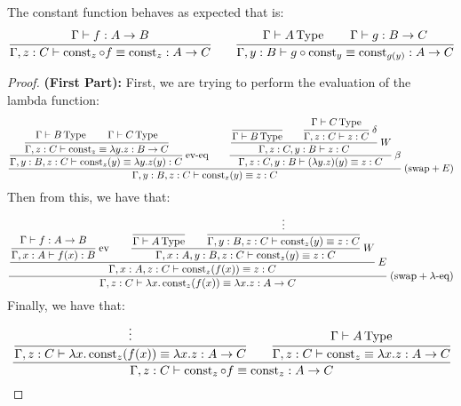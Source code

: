 \begin{lemma}
    \label{lemma:const-funct-compose}
    The constant function behaves as expected that is:
    \begin{equation*}
        \cfrac{\Gamma\vdash f:A\to B}{\Gamma, z:C\vdash \operatorname{const}_z\circ f\equiv\operatorname{const}_z:A\to C} \qquad \cfrac{\Gamma\vdash A\operatorname{Type} \qquad \Gamma\vdash g:B\to C}{\Gamma, y:B\vdash g\circ \operatorname{const}_y\equiv\operatorname{const}_{g(y)}:A\to C}
    \end{equation*}
\end{lemma}
\begin{dem}
\begin{proof}{\textbf{(First Part):}}
    First, we are trying to perform the evaluation of the lambda function:
    \begin{equation*}
        \cfrac{
            \cfrac{\cfrac{\Gamma\vdash B\type \qquad \Gamma\vdash C\type}{\Gamma, z:C\vdash\operatorname{const}_z\equiv\lambda y.z:B\to C}}{\Gamma, y:B, z:C\vdash\operatorname{const}_z(y)\equiv\lambda y.z(y):C}\text{ ev-eq}
            \qquad \cfrac{\cfrac{\cfrac{}{\Gamma\vdash B\type}\qquad \cfrac{\Gamma\vdash C\type}{\Gamma,z:C\vdash z:C} \ \delta}{\Gamma, z:C, y:B\vdash z:C} \ W}{\Gamma, z:C, y:B\vdash(\lambda y.z)(y)\equiv z:C}\ \beta
        }{\Gamma, y:B, z:C\vdash\operatorname{const}_z(y)\equiv z:C} \ (\text{swap}+E)
    \end{equation*}
    Then from this, we have that:
    \begin{equation*}
        \cfrac{\cfrac{\cfrac{\Gamma\vdash f:A\to B}{\Gamma, x:A\vdash f(x):B}\ \text{ev}\qquad \cfrac{\cfrac{}{\Gamma\vdash A\type}\qquad \cfrac{\vdots}{\Gamma, y:B, z:C\vdash\operatorname{const}_z(y)\equiv z:C}}{\Gamma, x:A, y:B, z:C\vdash\operatorname{const}_z(y)\equiv z:C} \ W}{\Gamma, x:A,z:C\vdash\operatorname{const}_z(f(x))\equiv z:C} \ E}{\Gamma,z:C\vdash\lambda x.\operatorname{const}_z(f(x))\equiv\lambda x.z:A\to C}\ (\text{swap}+\lambda\text{-eq})
    \end{equation*}
    Finally, we have that:
    \begin{equation*}
        \cfrac{\cfrac{\vdots}{\Gamma,z:C\vdash\lambda x.\operatorname{const}_z(f(x))\equiv\lambda x.z:A\to C}\qquad\cfrac{\Gamma\vdash A\operatorname{Type}}{\Gamma, z:C\vdash\operatorname{const}_z\equiv\lambda x.z:A\to C}}{\Gamma, z:C\vdash\operatorname{const}_z\circ f\equiv\operatorname{const}_z:A\to C}
    \end{equation*}
\end{proof}
\end{dem}
